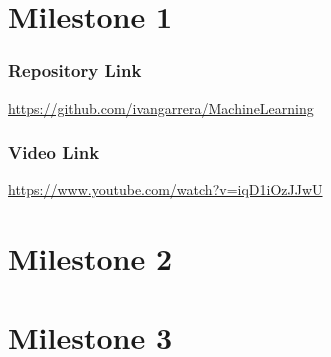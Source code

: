 \documentclass[twoside]{plantilla}
\begin{document}

\tableofcontents
\newpage
\part{Milestone 1}






\section{Repository Link}
\url{https://github.com/ivangarrera/MachineLearning}
\section{Video Link}
\url{https://www.youtube.com/watch?v=iqD1iOzJJwU}
\part{Milestone 2}



\part{Milestone 3}




\end{document}
